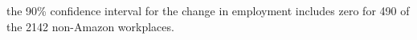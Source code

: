 the 90\% confidence interval for the change in employment includes zero for 490 of the 2142 non-Amazon workplaces.
